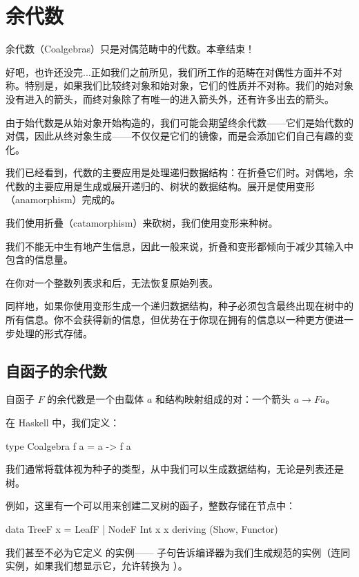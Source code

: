 \documentclass[DaoFP]{subfiles}
\begin{document}
\setcounter{chapter}{11}

\chapter{余代数}

余代数（Coalgebras）只是对偶范畴中的代数。本章结束！

好吧，也许还没完...正如我们之前所见，我们所工作的范畴在对偶性方面并不对称。特别是，如果我们比较终对象和始对象，它们的性质并不对称。我们的始对象没有进入的箭头，而终对象除了有唯一的进入箭头外，还有许多出去的箭头。

由于始代数是从始对象开始构造的，我们可能会期望终余代数——它们是始代数的对偶，因此从终对象生成——不仅仅是它们的镜像，而是会添加它们自己有趣的变化。

我们已经看到，代数的主要应用是处理递归数据结构：在折叠它们时。对偶地，余代数的主要应用是生成或展开递归的、树状的数据结构。展开是使用变形（anamorphism）完成的。

我们使用折叠（catamorphism）来砍树，我们使用变形来种树。

我们不能无中生有地产生信息，因此一般来说，折叠和变形都倾向于减少其输入中包含的信息量。

在你对一个整数列表求和后，无法恢复原始列表。

同样地，如果你使用变形生成一个递归数据结构，种子必须包含最终出现在树中的所有信息。你不会获得新的信息，但优势在于你现在拥有的信息以一种更方便进一步处理的形式存储。

\section{自函子的余代数}

自函子 $F$ 的余代数是一个由载体 $a$ 和结构映射组成的对：一个箭头 $a \to F a$。

在 Haskell 中，我们定义：
\begin{haskell}
 type Coalgebra f a = a -> f a
\end{haskell}
我们通常将载体视为种子的类型，从中我们可以生成数据结构，无论是列表还是树。

例如，这里有一个可以用来创建二叉树的函子，整数存储在节点中：
\begin{haskell}
data TreeF x = LeafF | NodeF Int x x
  deriving (Show, Functor)
\end{haskell}
我们甚至不必为它定义  的实例—— 子句告诉编译器为我们生成规范的实例（连同  实例，如果我们想显示它，允许转换为 ）。
\end{document}
